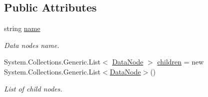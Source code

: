 \subsection*{Public Attributes}
\begin{DoxyCompactItemize}
\item 
string \mbox{\hyperlink{class_t_net_1_1_data_node_aaf44a44fb25aad98dd115faf7607858c}{name}}
\begin{DoxyCompactList}\small\item\em Data node\textquotesingle{}s name. \end{DoxyCompactList}\item 
System.\+Collections.\+Generic.\+List$<$ \mbox{\hyperlink{class_t_net_1_1_data_node}{Data\+Node}} $>$ \mbox{\hyperlink{class_t_net_1_1_data_node_ae70b404163bd692a010aa03505c884da}{children}} = new System.\+Collections.\+Generic.\+List$<$\mbox{\hyperlink{class_t_net_1_1_data_node}{Data\+Node}}$>$()
\begin{DoxyCompactList}\small\item\em List of child nodes. \end{DoxyCompactList}\end{DoxyCompactItemize}
